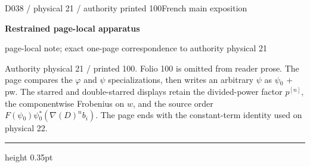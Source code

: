 \documentclass[9pt]{article}
\newcommand{\CanonText}[1]{\par{\fontsize{8.0}{9.35}\selectfont\RaggedRight #1\par}\vspace{2.2pt}}
\newcommand{\LayerTitle}{Restrained page-local apparatus}
\begin{document}
\noindent\begin{minipage}[t][\dimexpr\textheight-5pt\relax][t]{\textwidth}
{\sffamily\fontsize{7.3}{8.2}\selectfont\color{Quiet} D038 / physical 21 / authority printed 100\hfill French main exposition}
\par{}\vspace{4.5pt}
{\sffamily\fontsize{10.4}{11.6}\selectfont\bfseries\color{Accent} \LayerTitle}
\par{\sffamily\fontsize{6.7}{7.7}\selectfont\color{Quiet} page-local note; exact one-page correspondence to authority physical 21}
\vspace{5pt}
\CanonText{Authority physical 21 / printed 100. Folio 100 is omitted from reader prose. The page compares the \(\varphi{}\) and \(\psi{}\) specializations, then writes an arbitrary \(\psi{}\) as \(\psi{}_{0}\) + pw. The starred and double-starred displays retain the divided-power factor \(p^{[n]}\), the componentwise Frobenius on \(w\), and the source order \(F(\psi{}_{0})\psi{}_{0}^{*}(\nabla{}(D)^{n}b_{i})\). The page ends with the constant-term identity used on physical 22.}
\vfill
{\color{Accent}\hrule height 0.35pt}\vspace{3pt}
\end{minipage}
\newpage
\end{document}
